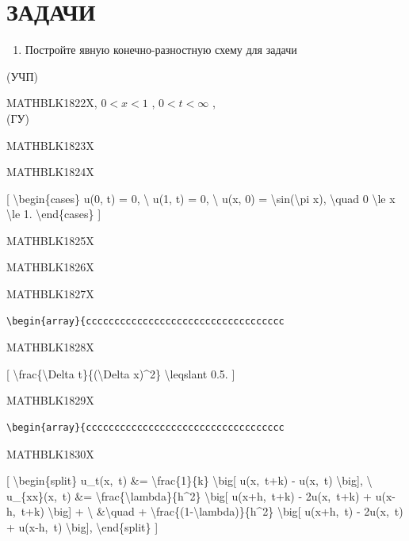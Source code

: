 \documentclass[
]{article}
\providecommand{\tightlist}{%
  \setlength{\itemsep}{0pt}\setlength{\parskip}{0pt}}
\begin{document}
\section{ЗАДАЧИ}\label{ux437ux430ux434ux430ux447ux438-16}

\begin{enumerate}
\def\labelenumi{\arabic{enumi}.}
\tightlist
\item
  Постройте явную конечно-разностную схему для задачи
\end{enumerate}

(УЧП)

MATHBLK1822X, \(0 < x < 1\) , \(0 < t < \infty\) ,\\
(ГУ)

MATHBLK1823X

MATHBLK1824X

{[} \textbackslash begin\{cases\} u(0, t) = 0, \textbackslash{} u(1, t)
= 0, \textbackslash{} u(x, 0) = \textbackslash sin(\textbackslash pi x),
\textbackslash quad 0 \textbackslash le x \textbackslash le 1.
\textbackslash end\{cases\} {]}

MATHBLK1825X

MATHBLK1826X

MATHBLK1827X

\begin{verbatim}
\begin{array}{ccccccccccccccccccccccccccccccccccc
\end{verbatim}

MATHBLK1828X

{[} \textbackslash frac\{\textbackslash Delta t\}\{(\textbackslash Delta
x)\^{}2\} \textbackslash leqslant 0.5. {]}

MATHBLK1829X

\begin{verbatim}
\begin{array}{ccccccccccccccccccccccccccccccccccc
\end{verbatim}

MATHBLK1830X

{[} \textbackslash begin\{split\} u\_t(x,~t) \&=
\textbackslash frac\{1\}\{k\} \textbackslash big{[} u(x,~t+k) - u(x,~t)
\textbackslash big{]}, \textbackslash{} u\_\{xx\}(x,~t) \&=
\textbackslash frac\{\textbackslash lambda\}\{h\^{}2\}
\textbackslash big{[} u(x+h,~t+k) - 2u(x,~t+k) + u(x-h,~t+k)
\textbackslash big{]} + \textbackslash{} \&\textbackslash quad +
\textbackslash frac\{(1-\textbackslash lambda)\}\{h\^{}2\}
\textbackslash big{[} u(x+h,~t) - 2u(x,~t) + u(x-h,~t)
\textbackslash big{]}, \textbackslash end\{split\} {]}
\end{document}

